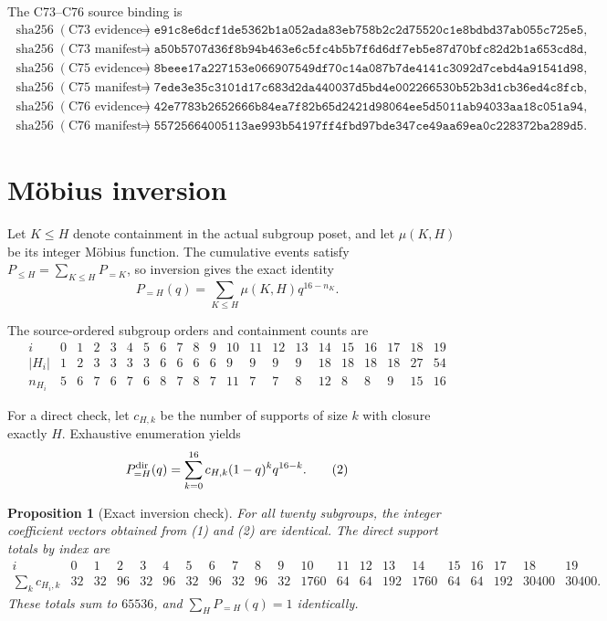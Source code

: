 \documentclass[10pt]{article}
\newtheorem{proposition}{Proposition}
\begin{document}
The C73--C76 source binding is
\[
\begin{split}
\operatorname{sha256}(\text{C73 evidence})&=\texttt{e91c8e6dcf1de5362b1a052ada83eb758b2c2d75520c1e8bdbd37ab055c725e5},\\
\operatorname{sha256}(\text{C73 manifest})&=\texttt{a50b5707d36f8b94b463e6c5fc4b5b7f6d6df7eb5e87d70bfc82d2b1a653cd8d},\\
\operatorname{sha256}(\text{C75 evidence})&=\texttt{8beee17a227153e066907549df70c14a087b7de4141c3092d7cebd4a91541d98},\\
\operatorname{sha256}(\text{C75 manifest})&=\texttt{7ede3e35c3101d17c683d2da440037d5bd4e002266530b52b3d1cb36ed4c8fcb},\\
\operatorname{sha256}(\text{C76 evidence})&=\texttt{42e7783b2652666b84ea7f82b65d2421d98064ee5d5011ab94033aa18c051a94},\\
\operatorname{sha256}(\text{C76 manifest})&=\texttt{55725664005113ae993b54197ff4fbd97bde347ce49aa69ea0c228372ba289d5}.
\end{split}
\]

\section{Möbius inversion}
Let $K\leq H$ denote containment in the actual subgroup poset, and let
$\mu(K,H)$ be its integer Möbius function.  The cumulative events satisfy
$P_{\leq H}=\sum_{K\leq H}P_{=K}$, so inversion gives the exact identity
\[
 P_{=H}(q)=\sum_{K\leq H}\mu(K,H)q^{16-n_K}.
 \tag{1}
\]

The source-ordered subgroup orders and containment counts are
{\scriptsize
\[
\begin{array}{c|rrrrrrrrrrrrrrrrrrrr}
 i&0&1&2&3&4&5&6&7&8&9&10&11&12&13&14&15&16&17&18&19\\\hline
 |H_i|&1&2&3&3&3&3&6&6&6&6&9&9&9&9&18&18&18&18&27&54\\
 n_{H_i}&5&6&7&6&7&6&8&7&8&7&11&7&7&8&12&8&8&9&15&16
\end{array}
\]
}\normalsize

For a direct check, let $c_{H,k}$ be the number of supports of size $k$ with
closure exactly $H$.  Exhaustive enumeration yields
\[
 P^{\rm dir}_{=H}(q)=\sum_{k=0}^{16}c_{H,k}(1-q)^kq^{16-k}.
 \tag{2}
\]

\begin{proposition}[Exact inversion check]
For all twenty subgroups, the integer coefficient vectors obtained from (1)
and (2) are identical.  The direct support totals by index are
{\scriptsize
\[
\begin{array}{c|rrrrrrrrrrrrrrrrrrrr}
 i&0&1&2&3&4&5&6&7&8&9&10&11&12&13&14&15&16&17&18&19\\\hline
 \sum_kc_{H_i,k}&32&32&96&32&96&32&96&32&96&32&1760&64&64&192&1760&64&64&192&30400&30400.
\end{array}
\]
}\normalsize
These totals sum to $65536$, and $\sum_H P_{=H}(q)=1$ identically.
\end{proposition}
\end{document}
